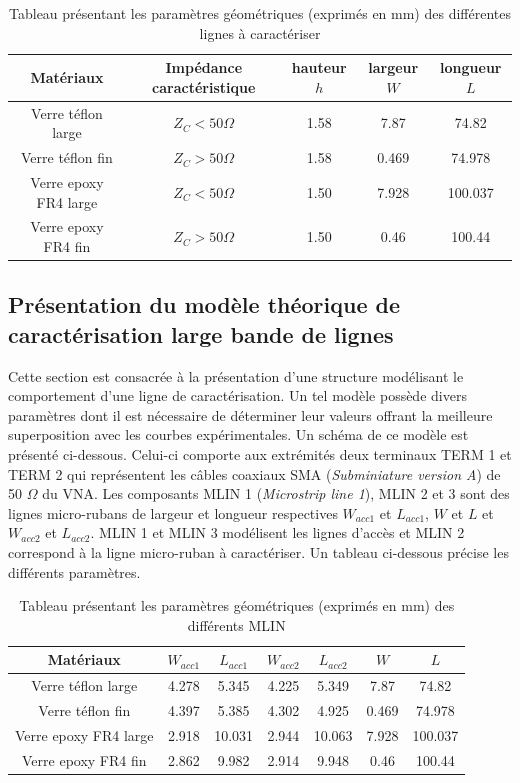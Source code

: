 \documentclass[french]{article}
\begin{document}
\begin{table}[H]
	\centering
	\begin{tabular}{|c|c|c|c|c|}
		\hline
		Matériaux & Impédance caractéristique & hauteur $h$ & largeur $W$ & longueur $L$\\
		\hline
		Verre téflon large & $Z_C < 50 \Omega$ & 1.58 & 7.87 & 74.82 \\
		\hline
		Verre téflon fin & $Z_C > 50 \Omega$ & 1.58 & 0.469 & 74.978\\
		\hline
		Verre epoxy FR4 large & $Z_C < 50 \Omega$ & 1.50 & 7.928 & 100.037\\
		\hline
		Verre epoxy FR4 fin & $Z_C > 50 \Omega$ & 1.50 & 0.46 & 100.44\\
		\hline
	\end{tabular}
	\caption{Tableau présentant les paramètres géométriques (exprimés en mm) des différentes lignes à caractériser}
	 \label{tab:geo_ligne}
\end{table}

\newpage

\subsection{Présentation du modèle théorique de caractérisation large bande de lignes}

Cette section est consacrée à la présentation d'une structure modélisant le comportement d'une ligne de caractérisation. Un tel modèle possède divers paramètres dont il est nécessaire de déterminer leur valeurs offrant la meilleure superposition avec les courbes expérimentales. Un schéma de ce modèle est présenté ci-dessous. Celui-ci comporte aux extrémités deux terminaux TERM 1 et TERM 2 qui représentent les câbles coaxiaux SMA (\textit{Subminiature version A}) de 50 $\Omega$ du VNA. Les composants MLIN 1 (\textit{Microstrip line 1}), MLIN 2 et 3 sont des lignes micro-rubans de largeur et longueur respectives $W_{acc1}$ et $L_{acc1}$, $W$ et $L$ et $W_{acc2}$ et $L_{acc2}$. MLIN 1 et MLIN 3 modélisent les lignes d'accès et MLIN 2 correspond à la ligne micro-ruban à caractériser. Un tableau ci-dessous précise les différents paramètres.

\begin{table}[H]
	\centering
	\begin{tabular}{|c|c|c|c|c|c|c|}
		\hline
		Matériaux & $W_{acc1}$ & $L_{acc1}$ & $W_{acc2}$ & $L_{acc2}$ & $W$ & $L$\\
		\hline
		Verre téflon large & 4.278 & 5.345 & 4.225 & 5.349 & 7.87 & 74.82 \\
		\hline
		Verre téflon fin & 4.397 & 5.385 & 4.302 & 4.925 & 0.469 & 74.978\\
		\hline
		Verre epoxy FR4 large & 2.918 & 10.031 & 2.944 & 10.063 & 7.928 & 100.037\\
		\hline
		Verre epoxy FR4 fin & 2.862 & 9.982 & 2.914 & 9.948 & 0.46 & 100.44\\
		\hline
	\end{tabular}
	\caption{Tableau présentant les paramètres géométriques (exprimés en mm) des différents MLIN}
\end{table}
\end{document}
